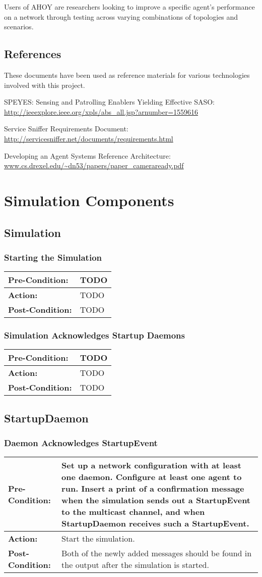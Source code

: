\documentclass[titlepage]{article}
\renewenvironment{itemize*}
    {\begin{itemize}
        \setlength{\itemsep}{0pt}%
        \setlength{\parskip}{0pt}%
        \setlength{\partopsep}{0pt}%
        \setlength{\topsep}{0pt}}%
    {\end{itemize}}
\newcommand{\testcase}[3]{
    \begin{center}
    \begin{tabular}{| l | p{0.7\textwidth}|}
        \hline
        \rowcolor[gray]{0.8}\textbf{Pre-Condition:} & #1 \\ \hline
        \textbf{Action:} & #2 \\ \hline
        \rowcolor[gray]{0.8}\textbf{Post-Condition:} & #3 \\ \hline
    \end{tabular}
    \end{center}
}
\begin{document}
Users of AHOY are researchers looking to improve a specific agent's performance on a network through testing across varying combinations of topologies and scenarios.

\subsection{References%
  \label{references}%
}

These documents have been used as reference materials for various technologies involved with this project.
%
\begin{itemize*}
	\item SPEYES: Sensing and Patrolling Enablers Yielding Effective SASO: \url{http://ieeexplore.ieee.org/xpls/abs_all.jsp?arnumber=1559616}
	\item Service Sniffer Requirements Document: \url{http://servicesniffer.net/documents/requirements.html}
    \item Developing an Agent Systems Reference Architecture: \url{www.cs.drexel.edu/~dn53/papers/paper_cameraready.pdf}
\end{itemize*}

\section{Simulation Components}
\subsection{Simulation}
\subsubsection{Starting the Simulation}

\testcase{TODO}{TODO}{TODO}

\subsubsection{Simulation Acknowledges Startup Daemons}

\testcase{TODO}{TODO}{TODO}

\subsection{StartupDaemon}
\subsubsection{Daemon Acknowledges StartupEvent}
\testcase{Set up a network configuration with at least one daemon.  Configure at least one agent to run.  Insert a print of a confirmation message when the simulation sends out a StartupEvent to the multicast channel, and when StartupDaemon receives such a StartupEvent.}{Start the simulation.}{Both of the newly added messages should be found in the output after the simulation is started.}
\end{document}
